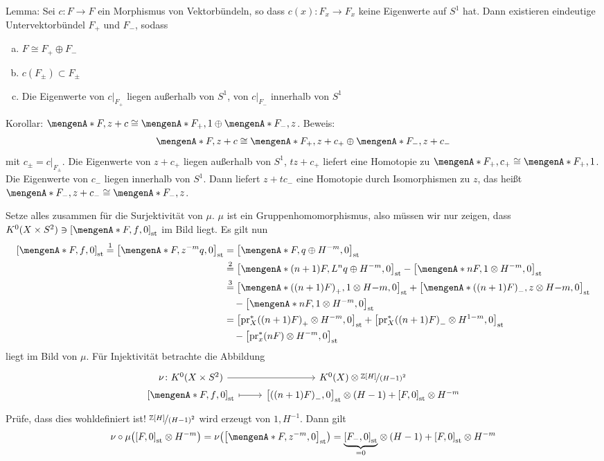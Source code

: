 \begin{enumerate}[1.]
	Lemma: Sei $c \colon F \to F$ ein Morphismus von Vektorbündeln, so dass $c(x) \colon F_x \to F_x$ keine Eigenwerte auf $S^1$ hat. Dann existieren eindeutige 
	Untervektorbündel $F_+$ und $F_-$, sodass 
	\begin{enumerate}[a)]
		\item $F \cong F_+ \oplus F_-$
		\item $c(F_\pm) \subset F_\pm$
		\item Die Eigenwerte von $c|_{F_+}$ liegen außerhalb von $S^1$, von $c|_{F_-}$ innerhalb von $S^1$
	\end{enumerate}
	
	Korollar: $\set{F,  z+c} \cong \set{F_+,1} \oplus \set{F_-,z}$. Beweis: 
	\[
		\set{F, z+c} \cong \set{F_+, z+ c_+} \oplus \set{F_-, z+ c_-} 
	\]
	mit $c_\pm = c|_{F_\pm}$. Die Eigenwerte von $z+ c_+$ liegen außerhalb von $S^1$, $tz + c_+$ liefert eine Homotopie zu $\set{F_+, c_+} \cong \set{F_+,1}$.
	Die Eigenwerte von $c_-$ liegen innerhalb von $S^1$. Dann liefert $z + t c_-$ eine Homotopie durch Isomorphismen zu $z$, das heißt $\set{F_-, z + c_-} \cong\set{F_-,z}$.
	\bewende
\end{enumerate}
Setze alles zusammen für die Surjektivität von $\mu$. $\mu$ ist ein Gruppenhomomorphismus, also müssen wir nur zeigen, dass 
$K^0(X \times S^2)\ni \benbrace*{\set{F,f},0 }_\st $ im Bild liegt. Es gilt nun
\begin{align*}
	\benbrace*{\set{F,f},0 }_\st \stackrel{1}{=} \benbrace*{\set{F, z^{-m} q},0 }_\st &= \benbrace*{\set{F,q} \oplus H^{-m},0 }_\st \\
	&\stackrel{2}{=} \benbrace*{\set{(n+1) F, L^n q} \oplus H^{-m},0 }_\st -  \benbrace*{\set{n F,1} \otimes H^{-m}, 0 }_\st \\
	&\stackrel{3}{=} \benbrace*{ \set{\enbrace*{(n+1)F}_+,1} \otimes H{-m},0 }_\st + \benbrace*{ \set{\enbrace*{(n+1)F}_-,z }\otimes H{-m},0 }_\st \\
	&\quad - \benbrace*{\set{n F,1} \otimes H^{-m},0 }_\st   \\
	&=  \benbrace*{\pr_X^* \enbrace*{(n+1)F}_+ \otimes H^{-m},0 }_\st + \benbrace*{\pr_X^* \enbrace*{(n+1)F}_- \otimes H^{1-m},0 }_\st  \\
	&\quad - \benbrace*{\pr_x^*(n F) \otimes H^{-m},0}_\st 
\end{align*}
liegt im Bild von $\mu$.
Für Injektivität betrachte die Abbildung 
\[
	\begin{tikzcd}[row sep=0.0em]
		\nu \colon K^0(X \times S^2) \rar & K^0(X)\otimes \nicefrac{\mathds{Z}[H]}{(H-1)^2} \\
		\benbrace*{\set{F,f},0 }_\st \rar[mapsto] & \benbrace*{ \enbrace*{(n+1)F}_- ,0 }_\st \otimes (H-1) + \benbrace*{F ,0}_\st \otimes H^{-m} 
	\end{tikzcd}
\]
Prüfe, dass dies wohldefiniert ist! $\nicefrac{\mathds{Z}[H]}{(H-1)^2}$ wird erzeugt von $1, H ^{-1}$. Dann gilt
\begin{align*}
	\nu \circ \mu \enbrace*{ \benbrace*{F,0}_\st \otimes H^{-m}} = \nu \enbrace*{ \benbrace*{\set{F,z^{-m}},0 }_\st } = \Underbrace{\benbrace*{F_-,0}_\st}{=0}  \otimes (H-1)
	+ \benbrace*{F,0}_\st \otimes H^{-m} 
\end{align*}

